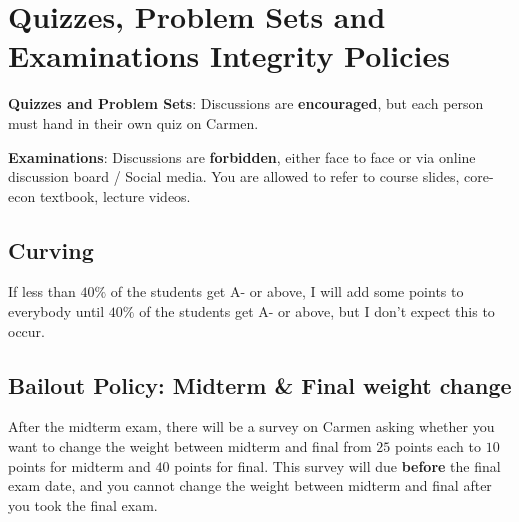 \documentclass[12pt]{article}
\begin{document}
\section*{Quizzes, Problem Sets and Examinations Integrity Policies}

\textbf{Quizzes and Problem Sets}: Discussions are \textbf{encouraged}, but each person must hand in their own quiz on Carmen.

\textbf{Examinations}: Discussions are \textbf{forbidden}, either face to face or via online discussion board / Social media. You are allowed to refer to course slides, core-econ textbook, lecture videos.



\subsection*{Curving}

If less than $40\%$ of the students get A- or above, I will add some points to everybody until $40\%$ of the students get A- or above, but I don’t expect this to occur.

\subsection*{Bailout Policy: Midterm \& Final weight change}
\label{sub:Bailout_Policy__Midterm____Final_weight_change}

After the midterm exam, there will be a survey on Carmen asking whether you want to change the weight between midterm and final from $ 25 $ points each to $ 10 $ points for midterm and $ 40  $ points for final.
This survey will due \textbf{before} the final exam date, and you cannot change the weight between midterm and final after you took the final exam.


\newpage

\end{document}
